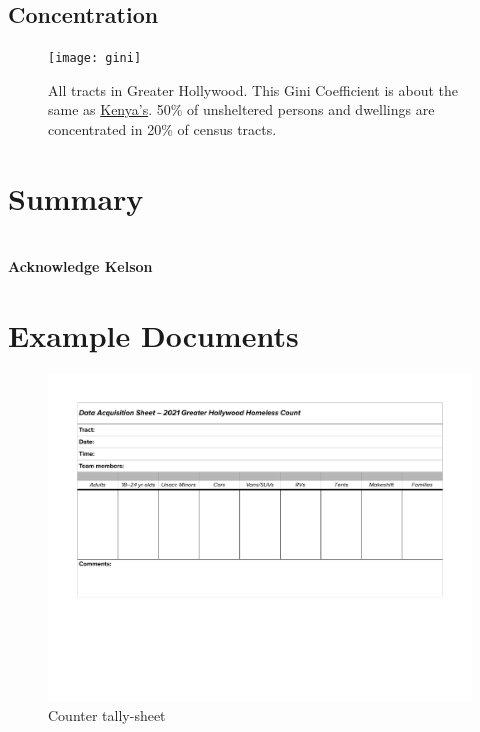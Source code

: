 \documentclass[11pt,twocolumn]{article}
\def\bfr{\bf\color{red}}
\begin{document}
\subsection{Concentration}
\label{sec:concentration}

\begin{figure}[]
	\centering
	\texttt{[image: gini]}
	\caption{All tracts in Greater Hollywood. This Gini Coefficient
			is about the same as 
			\href{https://en.wikipedia.org/wiki/List_of_countries_by_income_equality}{Kenya's}.
			50\% of unsheltered persons and dwellings are concentrated in 20\% of census
			tracts.}
	\label{fig:gini}
\end{figure}


\section{Summary}
\label{sec:summary}

\section*{}

{\bfr Acknowledge Kelson}

\appendix

\section{Example Documents}

\begin{figure}
	\centering
	\includegraphics[width =\linewidth]{Hollywood2021CountDataSheet}
	\caption{Counter tally-sheet}
\end{figure}
\end{document}
